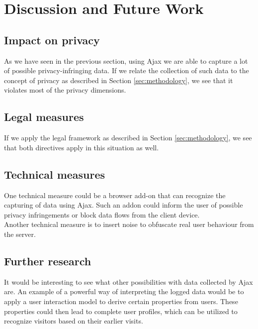 \section{Discussion and Future Work}
\label{sec:discussion}

\subsection{Impact on privacy}
As we have seen in the previous section, using Ajax we are able to capture a lot of possible privacy-infringing data. If we relate the collection of such data to the concept of privacy as described in Section \ref{sec:methodology}, we see that it violates most of the privacy dimensions. 

\subsection{Legal measures}
If we apply the legal framework as described in Section \ref{sec:methodology}, we see that both directives apply in this situation as well. 

\subsection{Technical measures}
One technical measure could be a browser add-on that can recognize the capturing of data using Ajax. Such an addon could inform the user of possible privacy infringements or block data flows from the client device.\\

Another technical measure is to insert noise to obfuscate real user behaviour from the server.

\subsection{Further research}
It would be interesting to see what other possibilities with data collected by Ajax are. An example of a powerful way of interpreting the logged data would be to apply a user interaction model to derive certain properties from users. These properties could then lead to complete user profiles, which can be utilized to recognize visitors based on their earlier visits.